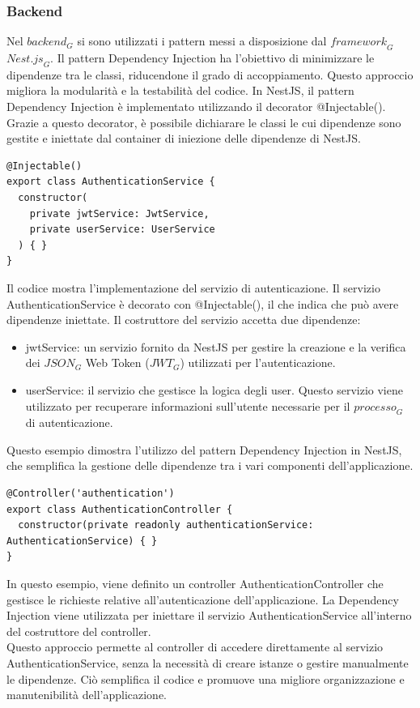 \subsubsection{Backend}
Nel $\textit{backend}_G$ si sono utilizzati i pattern messi a disposizione dal $\textit{framework}_G$ $\textit{Nest.js}_G$.
Il pattern Dependency Injection ha l'obiettivo di minimizzare le dipendenze tra le classi, riducendone il grado di accoppiamento. Questo approccio migliora la modularità e la testabilità del codice.
In NestJS, il pattern Dependency Injection è implementato utilizzando il decorator @Injectable(). Grazie a questo decorator, è possibile dichiarare le classi le cui dipendenze sono gestite e iniettate dal container di iniezione delle dipendenze di NestJS.
\begin{lstlisting}[style=ES6, caption={Esempio di utilizzo della Dependency Injection con il decorator @Injectable in un servizio di autenticazione}]
@Injectable()
export class AuthenticationService {
  constructor(
    private jwtService: JwtService,
    private userService: UserService
  ) { }
}
\end{lstlisting}
Il codice mostra l'implementazione del servizio di autenticazione. Il servizio AuthenticationService è decorato con @Injectable(), il che indica che può avere dipendenze iniettate.
Il costruttore del servizio accetta due dipendenze:
\begin{itemize}
\item jwtService: un servizio fornito da NestJS per gestire la creazione e la verifica dei $\textit{JSON}_G$ Web Token ($\textit{JWT}_G$) utilizzati per l'autenticazione.
\item userService: il servizio che gestisce la logica degli user. Questo servizio viene utilizzato per recuperare informazioni sull'utente necessarie per il $\textit{processo}_G$ di autenticazione.
\end{itemize}
Questo esempio dimostra l'utilizzo del pattern Dependency Injection in NestJS, che semplifica la gestione delle dipendenze tra i vari componenti dell'applicazione. \\
\begin{lstlisting}[style=ES6, caption={Esempio di utilizzo della Dependency Injection per gestire il controller e il service}]
@Controller('authentication')
export class AuthenticationController {
  constructor(private readonly authenticationService: AuthenticationService) { }
}
\end{lstlisting}
In questo esempio, viene definito un controller AuthenticationController che gestisce le richieste relative all'autenticazione dell'applicazione. La Dependency Injection viene utilizzata per iniettare il servizio AuthenticationService all'interno del costruttore del controller.\\
Questo approccio permette al controller di accedere direttamente al servizio AuthenticationService, senza la necessità di creare istanze o gestire manualmente le dipendenze. Ciò semplifica il codice e promuove una migliore organizzazione e manutenibilità dell'applicazione.

